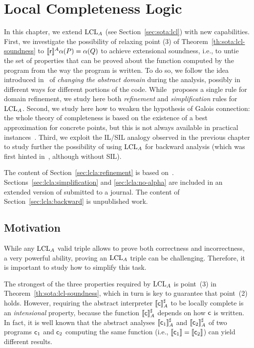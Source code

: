 
\chapter{Local Completeness Logic}\label{ch:lcla}
In this chapter, we extend $\text{LCL}_A$ (see Section~\ref{sec:sota:lcl}) with new capabilities. First, we investigate the possibility of relaxing point (3) of Theorem~\ref{th:sota:lcl-soundness} to $\llbracket\mathsf{r}\rrbracket^{A} \alpha(P) = \alpha(Q)$ to achieve extensional soundness, i.e., to untie the set of properties that can be proved about the function computed by the program from the way the program is written. To do so, we follow the idea introduced in~\cite[§8]{BGGR23} of \emph{changing the abstract domain} during the analysis, possibly in different ways for different portions of the code.
While~\cite{BGGR23} proposes a single rule for domain refinement, we study here both \emph{refinement} and \emph{simplification} rules for $\text{LCL}_A$.
Second, we study here how to weaken the hypothesis of Galois connection: the whole theory of completeness is based on the existence of a best approximation for concrete points, but this is not always available in practical instances~\cite{CC92}.
Third, we exploit the IL/SIL analogy observed in the previous chapter to study further the possibility of using $\text{LCL}_A$ for backward analysis (which was first hinted in~\cite[\S 5.3]{BGGR23}, although without SIL).

The content of Section~\ref{sec:lcla:refinement} is based on~\cite{ABG23}. Sections~\ref{sec:lcla:simplification} and \ref{sec:lcla:no-alpha} are included in an extended version of \cite{ABG23} submitted to a journal. The content of Section~\ref{sec:lcla:backward} is unpublished work.

\section{Motivation}
While any $\text{LCL}_A$ valid triple allows to prove both correctness and incorrectness, a very powerful ability, proving an $\text{LCL}_A$ triple can be challenging. Therefore, it is important to study how to simplify this task.

The strongest of the three properties required by $\text{LCL}_A$ is point~(3) in Theorem~\ref{th:sota:lcl-soundness}, which in turn is key to guarantee that point~(2) holds.
However, requiring the abstract interpreter $\llbracket\mathsf{c}\rrbracket^{\sharp}_{A}$ to be locally complete is an \emph{intensional} property, because the function $\llbracket\mathsf{c}\rrbracket^{\sharp}_{A}$ depends on how $\mathsf{c}$ is written.
In fact, it is well known that the abstract analyses $\llbracket\mathsf{c}_1\rrbracket^{\sharp}_{A}$ and $\llbracket\mathsf{c}_2\rrbracket^{\sharp}_{A}$ of two programs $\mathsf{c}_1$ and $\mathsf{c}_2$ computing the same function (i.e., $\llbracket\mathsf{c}_1\rrbracket=\llbracket\mathsf{c}_2\rrbracket$) can yield different results.

